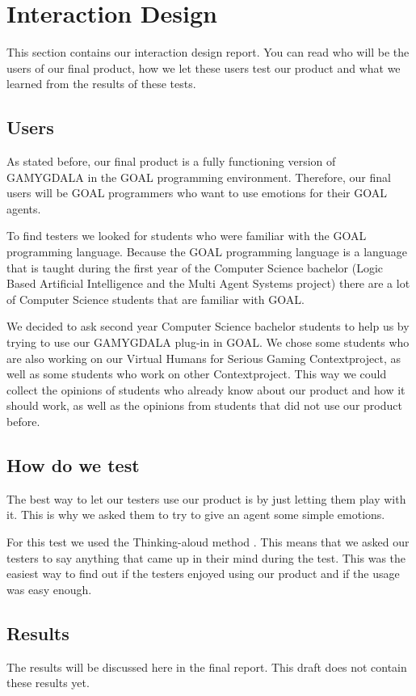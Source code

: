\section{Interaction Design}
This section contains our interaction design report. You can read who will be the users of our final product, how we let these users test our product and what we learned from the results of these tests.

\subsection{Users}
As stated before, our final product is a fully functioning version of GAMYGDALA in the GOAL programming environment. Therefore, our final users will be GOAL programmers who want to use emotions for their GOAL agents. \par
To find testers we looked for students who were familiar with the GOAL programming language. Because the GOAL programming language is a language that is taught during the first year of the Computer Science bachelor (Logic Based Artificial Intelligence and the Multi Agent Systems project) there are a lot of Computer Science students that are familiar with GOAL. \par
We decided to ask second year Computer Science bachelor students to help us by trying to use our GAMYGDALA plug-in in GOAL. We chose some students who are also working on our Virtual Humans for Serious Gaming Contextproject, as well as some students who work on other Contextproject. This way we could collect the opinions of students who already know about our product and how it should work, as well as the opinions from students that did not use our product before.

\subsection{How do we test}
The best way to let our testers use our product is by just letting them play with it. This is why we asked them to try to give an agent some simple emotions. \par
For this test we used the Thinking-aloud method \citep{thinking-aloud}. This means that we asked our testers to say anything that came up in their mind during the test. This was the easiest way to find out if the testers enjoyed using our product and if the usage was easy enough.

\subsection{Results}
The results will be discussed here in the final report. This draft does not contain these results yet.